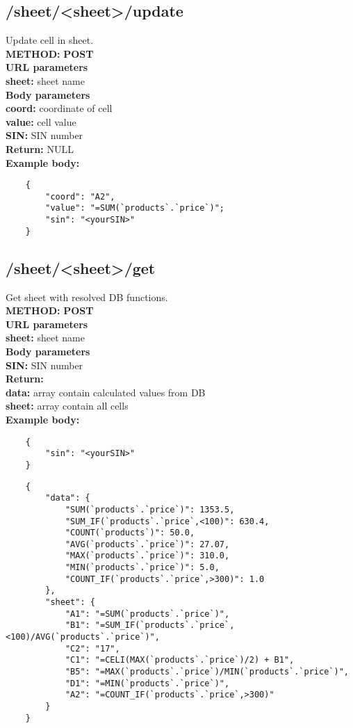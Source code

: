 \documentclass[a4paper, 12pt]{report}
\begin{document}
\subsection{/sheet/<sheet>/update}
Update cell in sheet.\\
\textbf{\color{redText} METHOD: } \textbf{POST} \\
\textbf{\color{redText} URL parameters} \\
\textbf{sheet: } sheet name\\
\textbf{\color{redText} Body parameters} \\
\textbf{coord: } coordinate of cell\\
\textbf{value: } cell value\\
\textbf{SIN: } SIN number\\
\textbf{\color{redText} Return: } NULL\\
\textbf{\color{redText} Example body: }
\begin{lstlisting}
    {
        "coord": "A2",
        "value": "=SUM(`products`.`price`)";
        "sin": "<yourSIN>"
    }
\end{lstlisting}

\subsection{/sheet/<sheet>/get}
Get sheet with resolved DB functions.\\
\textbf{\color{redText} METHOD: } \textbf{POST} \\
\textbf{\color{redText} URL parameters} \\
\textbf{sheet: } sheet name\\
\textbf{\color{redText} Body parameters} \\
\textbf{SIN: } SIN number\\
\textbf{\color{redText} Return: } \\
\textbf{data: } array contain calculated values from DB\\
\textbf{sheet: } array contain all cells\\
\textbf{\color{redText} Example body: }
\begin{lstlisting}
    {
        "sin": "<yourSIN>"
    }
\end{lstlisting}

\begin{lstlisting}
    {
        "data": {
            "SUM(`products`.`price`)": 1353.5,
            "SUM_IF(`products`.`price`,<100)": 630.4,
            "COUNT(`products`)": 50.0,
            "AVG(`products`.`price`)": 27.07,
            "MAX(`products`.`price`)": 310.0,
            "MIN(`products`.`price`)": 5.0,
            "COUNT_IF(`products`.`price`,>300)": 1.0
        },
        "sheet": {
            "A1": "=SUM(`products`.`price`)",
            "B1": "=SUM_IF(`products`.`price`,<100)/AVG(`products`.`price`)",
            "C2": "17",
            "C1": "=CELI(MAX(`products`.`price`)/2) + B1",
            "B5": "=MAX(`products`.`price`)/MIN(`products`.`price`)",
            "D1": "=MIN(`products`.`price`)",
            "A2": "=COUNT_IF(`products`.`price`,>300)"
        }
    }
\end{lstlisting}
\end{document}
